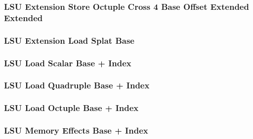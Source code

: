 \subsubsection[{\small LSU Extension Store Octuple Cross 4 Base Offset Extended Extended}]{LSU Extension Store Octuple Cross 4 Base Offset Extended Extended} \label{sec:format-LSU-XSOC4BO.Y}



\subsubsection[{\small LSU Extension Load Splat Base}]{LSU Extension Load Splat Base} \label{sec:format-LSU-XLSB}



\subsubsection[{\small LSU Load Scalar Base + Index}]{LSU Load Scalar Base + Index} \label{sec:format-LSU-LSBI}



\subsubsection[{\small LSU Load Quadruple Base + Index}]{LSU Load Quadruple Base + Index} \label{sec:format-LSU-LQBI}



\subsubsection[{\small LSU Load Octuple Base + Index}]{LSU Load Octuple Base + Index} \label{sec:format-LSU-LOBI}



\subsubsection[{\small LSU Memory Effects Base + Index}]{LSU Memory Effects Base + Index} \label{sec:format-LSU-FXBI}

